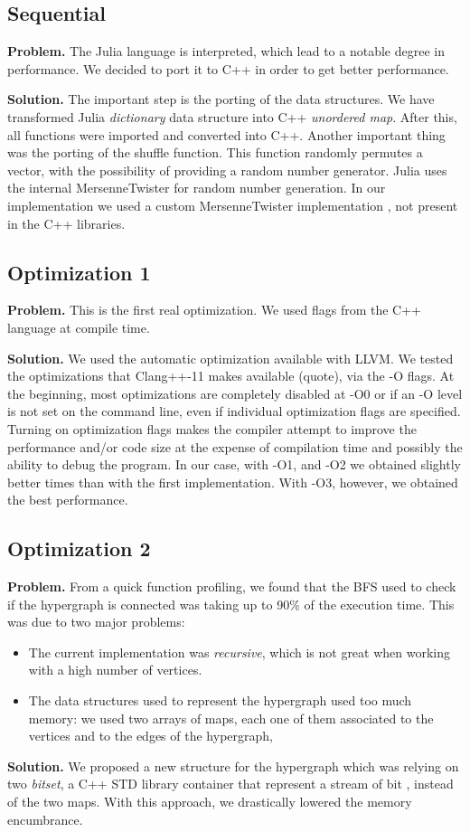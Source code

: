 \documentclass[conference]{IEEEtran}
\newcommand{\mypar}[1]{{\bf #1.}}
\begin{document}
\subsection{Sequential}
\mypar{Problem} 
The Julia language is interpreted, which lead to a notable degree in performance. We decided to port it to C++ in order to get better performance.

\mypar{Solution}
The important step is the porting of the data structures. We have transformed Julia \textit{dictionary} data structure into C++ \textit{unordered map}. After this, all functions were imported and converted into C++. 
Another important thing was the porting of the shuffle function. This function randomly permutes a vector, with the possibility of providing a random number generator. Julia uses the internal MersenneTwister \cite{MarsenneTwister} for random number generation. In our implementation we used a custom MersenneTwister implementation \cite{threadSafeMarsenneTwister}, not present in the C++ libraries.

\subsection{Optimization 1}
\mypar{Problem}
This is the first real optimization. We used flags from the C++ language at compile time. 

\mypar{Solution}
We used the automatic optimization available with LLVM. We tested the optimizations that Clang++-11 makes available (quote), via the -O flags. At the beginning, most optimizations are completely disabled at -O0 or if an -O level is not set on the command line, even if individual optimization flags are specified. Turning on optimization flags makes the compiler attempt to improve the performance and/or code size at the expense of compilation time and possibly the ability to debug the program.
In our case, with -O1, and -O2 we obtained slightly better times than with the first implementation. With -O3, however, we obtained the best performance.

\subsection{Optimization 2}
\mypar{Problem}
From a quick function profiling, we found that the BFS used to check if the hypergraph is connected was taking up to 90\% of the execution time. This was due to two major problems:
\begin{itemize}
    \item The current implementation was \textit{recursive}, which is not great when working with a high number of vertices.
    \item The data structures used to represent the hypergraph used too much memory: we used two arrays of maps, each one of them associated to the vertices and to the edges of the hypergraph, 
\end{itemize}
\mypar{Solution}
We proposed a new structure for the hypergraph which was relying on two \textit{bitset}, a C++ STD library container that represent a stream of bit \cite{bitset}, instead of the two maps. With this approach, we drastically lowered the memory encumbrance.
\end{document}
